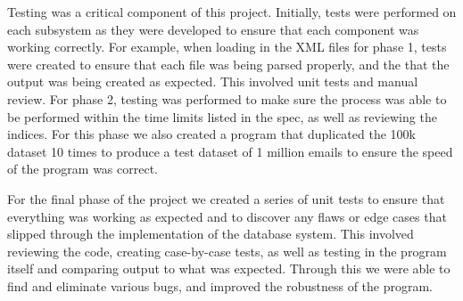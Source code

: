 Testing was a critical component of this project.  Initially, tests were performed 
on each subsystem as they were developed to ensure that each component was working 
correctly.  For example, when loading in the XML files for phase 1, tests were 
created to ensure that each file was being parsed properly, and the that the 
output was being created as expected.  This involved unit tests and manual review.  
For phase 2, testing was performed to make sure the process was able to be 
performed within the time limits listed in the spec, as well as reviewing the 
indices.  For this phase we also created a program that duplicated the 100k dataset 
10 times to produce a test dataset of 1 million emails to ensure the speed of the 
program was correct.  

For the final phase of the project we created a series of unit tests to ensure that 
everything was working as expected and to discover any flaws or edge cases that 
slipped through the implementation of the database system.  This involved reviewing 
the code, creating case-by-case tests, as well as testing in the program itself and 
comparing output to what was expected.  Through this we were able to find and 
eliminate various bugs, and improved the robustness of the program.   
